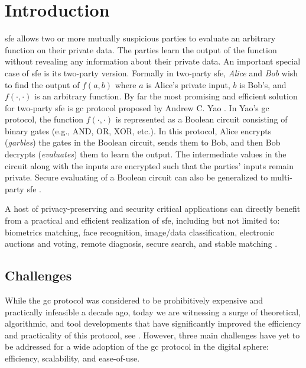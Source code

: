 \chapter{Introduction}
\acrfull{sfe} allows two or more mutually suspicious parties to evaluate an arbitrary function on their private data.
The parties learn the output of the function without revealing any information about their private data.
An important special case of \acrshort{sfe} is its two-party version.
Formally in two-party \acrshort{sfe}, \textit{Alice} and \textit{Bob} wish to find the output of $f(a, b)$ where $a$ is Alice's private input, $b$ is Bob's, and $f(\cdot,\cdot)$ is an arbitrary function.
By far the most promising and efficient solution for two-party \acrshort{sfe} is \acrfull{gc} protocol proposed by Andrew C. Yao \cite{yao1986generate}.
In Yao's \acrshort{gc} protocol, the function $f(\cdot,\cdot)$ is represented as a Boolean circuit consisting of binary gates (e.g., AND, OR, XOR, etc.).
In this protocol, Alice encrypts (\textit{garbles}) the gates in the Boolean circuit, sends them to Bob, and then Bob decrypts (\textit{evaluates}) them to learn the output.
The intermediate values in the circuit along with the inputs are encrypted such that the parties' inputs remain private.
Secure evaluating of a Boolean circuit can also be generalized to multi-party \acrshort{sfe} \cite{goldreich1987play, ben2008fairplaymp}.

A host of privacy-preserving and security critical applications can directly benefit from a practical and efficient realization of \acrshort{sfe}, including but not limited to: biometrics matching, face recognition, image/data classification, electronic auctions and voting, remote diagnosis, secure search, and stable matching \cite{riazi2017toward, zhang2016robust, bringer2013privacy, evans2011efficient, barni2009secure, naor1999privacy, brickell2007privacy, jha2008towards}.

\section{Challenges}
While the \acrshort{gc} protocol was considered to be prohibitively expensive and practically infeasible a decade ago, today we are witnessing a surge of theoretical, algorithmic, and tool developments that have significantly improved the efficiency and practicality of this protocol, see \cite{malkhi2004fairplay, kolesnikov2008improved, pinkas2009secure, huang2011faster, bellare2013efficient, zahur2015two, zahur2015obliv, liu2015oblivm}.
However, three main challenges have yet to be addressed for a wide adoption of the \acrshort{gc} protocol in the digital sphere: efficiency, scalability, and ease-of-use.

